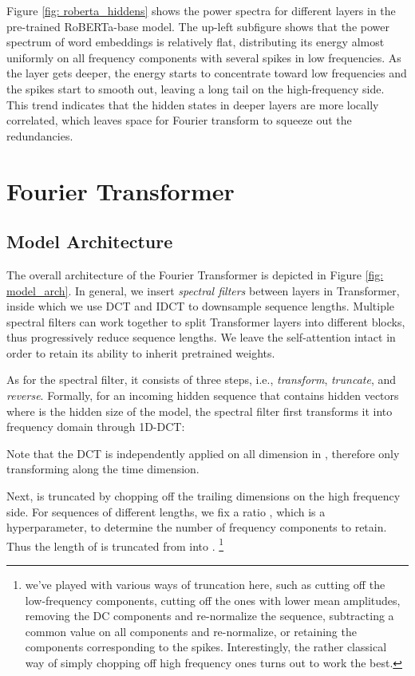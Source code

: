 \documentclass[11pt]{article}
\begin{document}
Figure \ref{fig: roberta_hiddens} shows the power spectra for different layers in the pre-trained RoBERTa-base \citep{liu2019roberta} model. The up-left subfigure shows that the power spectrum of word embeddings is relatively flat, distributing its energy almost uniformly on all frequency components with several spikes in low frequencies. As the layer gets deeper, the energy starts to concentrate toward low frequencies and the spikes start to smooth out, leaving a long tail on the high-frequency side. This trend indicates that the hidden states in deeper layers are more locally correlated, which leaves space for Fourier transform to squeeze out the redundancies.


\section{Fourier Transformer}
\subsection{Model Architecture}
The overall architecture of the Fourier Transformer is depicted in Figure \ref{fig: model_arch}. In general, we insert \textit{spectral filters} between layers in Transformer, inside which we use DCT and IDCT to downsample sequence lengths. Multiple spectral filters can work together to split Transformer layers into different blocks, thus progressively reduce sequence lengths. We leave the self-attention intact in order to retain its ability to inherit pretrained weights.

As for the spectral filter, it consists of three steps, i.e., \textit{transform}, \textit{truncate}, and \textit{reverse}. Formally, for an incoming hidden sequence  that contains  hidden vectors  where  is the hidden size of the model, the spectral filter first transforms it into frequency domain through 1D-DCT:

Note that the DCT is independently applied on all dimension in , therefore only transforming along the time dimension. 

Next,  is truncated by chopping off the trailing dimensions on the high frequency side. For sequences of different lengths, we fix a ratio , which is a hyperparameter, to determine the number of frequency components to retain. Thus the length of  is truncated from  into . \footnote{we've played with various ways of truncation here, such as cutting off the low-frequency components, cutting off the ones with lower mean amplitudes, removing the DC components and re-normalize the sequence, subtracting a common value on all components and re-normalize, or retaining the components corresponding to the spikes. Interestingly, the rather classical way of simply chopping off high frequency ones turns out to work the best.}
\end{document}
